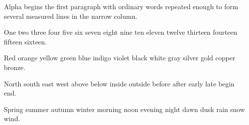 
\hsize=220pt \vsize=240pt
Alpha begins the first paragraph with ordinary words repeated enough to form several measured lines in the narrow column.

One two three four five six seven eight nine ten eleven twelve thirteen fourteen fifteen sixteen.

Red orange yellow green blue indigo violet black white gray silver gold copper bronze.

North south east west above below inside outside before after early late begin end.

Spring summer autumn winter morning noon evening night dawn dusk rain snow wind.
\bye
